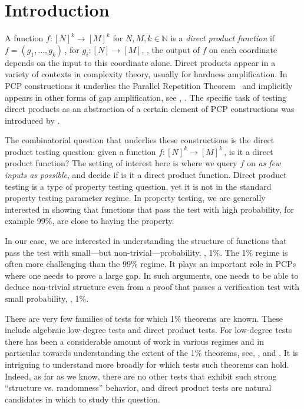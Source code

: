 \documentclass{toc}
\newcommand\f{f} %
\newcommand\pf{g} %
\begin{document}
\section{Introduction}
%
A function $\f:[N]^k\rightarrow[M]^k$ for $N,M,k\in\mathbb{N}$
%
is a \emph{direct product function} if $\f=(\pf_1,\ldots, \pf_k)$\,, for $\pf_i:[N]\rightarrow[M]$, \ie, the output of $\f$ on each coordinate depends on the input to this coordinate alone.
%
%
Direct products appear in a variety of contexts in 
%
complexity theory,  %
usually for hardness amplification. In %
PCP constructions  %
it underlies the Parallel Repetition Theorem~%
%
\cite{raz1998parallel} and implicitly appears in other forms of gap amplification, see %
\eg, \cite{dinur2007pcp}. The specific task of testing direct products as an abstraction of a certain element of PCP constructions was introduced by \cite{goldreich2000combinatorial}.

%
The combinatorial question that underlies these %
%
constructions %
is the direct product testing question: given a function $\f:[N]^k\rightarrow[M]^k$\,, is it a direct product function? The setting of interest here is where we query $\f$ %
on  %
\emph{as few inputs as possible}, and decide 
if is it a direct product function. %
%
%
Direct product testing  %
is a type of property testing question, yet it is not in the standard property testing parameter regime. In property testing, we are generally interested in showing that functions that pass the test with high probability, for example 99\%, are close to having the property.

In our case, we are interested in understanding the structure of functions that pass the test with small---but non-trivial---probability, \eg, 1\%. The 1\% regime is often more challenging than the 99\% regime. It plays an important role in PCPs where one needs to prove a large gap. In such arguments, one needs to be able to deduce %
non-trivial  %
structure even from a proof that passes a verification test with small probability, \eg, 1\%.

There are very few families of tests for which 1\% theorems are known. These include algebraic %
low-degree  %
tests and direct product tests. For low-degree %
tests there has been a considerable amount of work in various regimes and in particular towards understanding the extent of the 1\% theorems, see, \eg, \cite{RaSa,ArSu,BDL17} and \cite{bergelson2010inverse}.
%
It is intriguing to understand more broadly for which tests such theorems can hold.  Indeed, as far as we know, there are no other tests that exhibit such strong ``structure vs. randomness'' behavior, and direct product tests are natural candidates in which to study this question.
\end{document}
